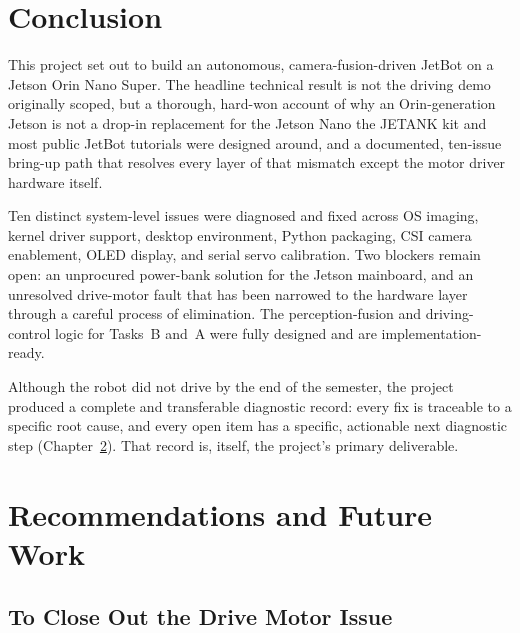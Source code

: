 \documentclass{imc-inf}
\begin{document}
\chapter{Conclusion}
\label{chap:conclusion}

This project set out to build an autonomous, camera-fusion-driven JetBot on a
Jetson Orin Nano Super. The headline technical result is not the driving demo
originally scoped, but a thorough, hard-won account of why an Orin-generation Jetson
is not a drop-in replacement for the Jetson Nano the JETANK kit and most public
JetBot tutorials were designed around, and a documented, ten-issue bring-up path
that resolves every layer of that mismatch except the motor driver hardware itself.

Ten distinct system-level issues were diagnosed and fixed across OS imaging, kernel
driver support, desktop environment, Python packaging, CSI camera enablement, OLED
display, and serial servo calibration. Two blockers remain open: an unprocured
power-bank solution for the Jetson mainboard, and an unresolved drive-motor fault
that has been narrowed to the hardware layer through a careful process of elimination.
The perception-fusion and driving-control logic for Tasks~B and~A were fully designed
and are implementation-ready.

Although the robot did not drive by the end of the semester, the project produced
a complete and transferable diagnostic record: every fix is traceable to a specific
root cause, and every open item has a specific, actionable next diagnostic step
(Chapter~\ref{chap:recommendations}). That record is, itself, the project's primary
deliverable.

\chapter[Recommendations]{Recommendations and Future Work}
\label{chap:recommendations}

\section{To Close Out the Drive Motor Issue}
\label{sec:close-motor}
\end{document}
